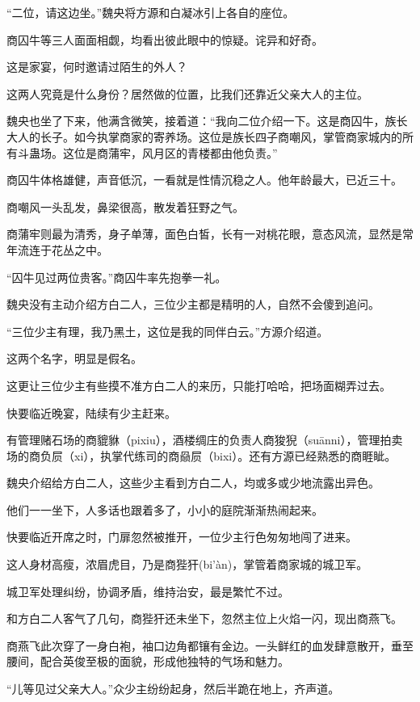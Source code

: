 \begin{this_body}
“二位，请这边坐。”魏央将方源和白凝冰引上各自的座位。

商囚牛等三人面面相觑，均看出彼此眼中的惊疑。诧异和好奇。

这是家宴，何时邀请过陌生的外人？

这两人究竟是什么身份？居然做的位置，比我们还靠近父亲大人的主位。

魏央也坐了下来，他满含微笑，接着道：“我向二位介绍一下。这是商囚牛，族长大人的长子。如今执掌商家的寄养场。这位是族长四子商嘲风，掌管商家城内的所有斗蛊场。这位是商蒲牢，风月区的青楼都由他负责。”

商囚牛体格雄健，声音低沉，一看就是性情沉稳之人。他年龄最大，已近三十。

商嘲风一头乱发，鼻梁很高，散发着狂野之气。

商蒲牢则最为清秀，身子单薄，面色白皙，长有一对桃花眼，意态风流，显然是常年流连于花丛之中。

“囚牛见过两位贵客。”商囚牛率先抱拳一礼。

魏央没有主动介绍方白二人，三位少主都是精明的人，自然不会傻到追问。

“三位少主有理，我乃黑土，这位是我的同伴白云。”方源介绍道。

这两个名字，明显是假名。

这更让三位少主有些摸不准方白二人的来历，只能打哈哈，把场面糊弄过去。

快要临近晚宴，陆续有少主赶来。

有管理赌石场的商貔貅（pixiu），酒楼绸庄的负责人商狻猊（suānni），管理拍卖场的商负屃（xi），执掌代练司的商赑屃（bixi）。还有方源已经熟悉的商睚眦。

魏央介绍给方白二人，这些少主看到方白二人，均或多或少地流露出异色。

他们一一坐下，人多话也跟着多了，小小的庭院渐渐热闹起来。

快要临近开席之时，门扉忽然被推开，一位少主行色匆匆地闯了进来。

这人身材高瘦，浓眉虎目，乃是商狴犴(bi’àn)，掌管着商家城的城卫军。

城卫军处理纠纷，协调矛盾，维持治安，最是繁忙不过。

和方白二人客气了几句，商狴犴还未坐下，忽然主位上火焰一闪，现出商燕飞。

商燕飞此次穿了一身白袍，袖口边角都镶有金边。一头鲜红的血发肆意散开，垂至腰间，配合英俊至极的面貌，形成他独特的气场和魅力。

“儿等见过父亲大人。”众少主纷纷起身，然后半跪在地上，齐声道。


\end{this_body}
